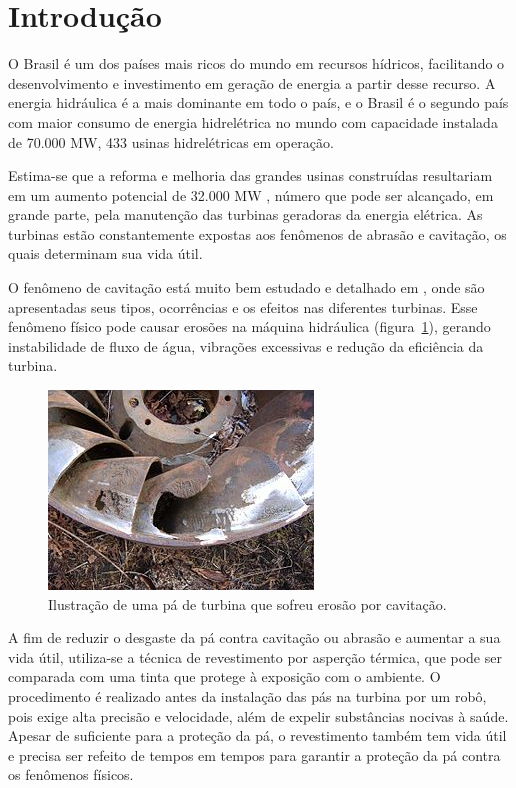 \section{Introdução}
O Brasil é um dos países mais ricos do mundo em recursos hídricos, facilitando o
desenvolvimento e investimento em geração de energia a partir desse recurso. A
energia hidráulica é a mais dominante em todo o país, e o Brasil é o segundo
país com maior consumo de energia hidrelétrica no mundo com capacidade
instalada de 70.000 MW, 433 usinas hidrelétricas em operação. 

Estima-se que a reforma e melhoria das grandes usinas construídas resultariam
em um aumento potencial de 32.000 MW \citep{goldemberg2007energia},
número que pode ser alcançado, em grande parte, pela manutenção das turbinas
geradoras da energia elétrica. As turbinas estão constantemente expostas aos
fenômenos de abrasão e cavitação, os quais determinam sua vida útil.

O fenômeno de cavitação está muito bem estudado e detalhado em
\cite{escaler2006detection}, onde são apresentadas seus tipos, ocorrências e os
efeitos nas diferentes turbinas. Esse fenômeno físico pode causar erosões na
máquina hidráulica (figura~\ref{fig::cavitacao}), gerando instabilidade de fluxo
de água, vibrações excessivas e redução da eficiência da turbina.

\begin{figure}[h!]
	\centering	
	\includegraphics[width=0.7\columnwidth]{sota/figs/intro/cavitacao}
	\caption{Ilustração de uma pá de turbina que sofreu erosão por cavitação.}
	\label{fig::cavitacao}
\end{figure}

A fim de reduzir o desgaste da pá contra cavitação ou abrasão e aumentar a sua
vida útil, utiliza-se a técnica de revestimento por asperção térmica, que pode ser comparada com uma
tinta que protege à exposição com o ambiente. O procedimento é realizado
antes da instalação das pás na turbina por um robô, pois exige alta precisão
e velocidade, além de expelir substâncias nocivas à saúde. Apesar de suficiente para a proteção da pá, o
revestimento também tem vida útil e precisa ser refeito de tempos em tempos para
garantir a proteção da pá contra os fenômenos físicos.


